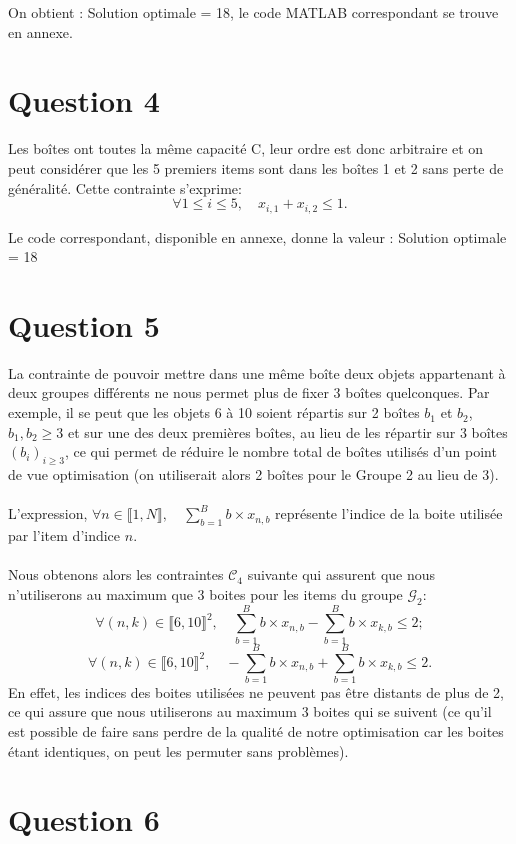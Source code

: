 On obtient : Solution optimale  = 18, le code MATLAB correspondant se trouve en annexe.
\section{Question 4}
Les boîtes ont toutes la même capacité C, leur ordre est donc arbitraire et on peut considérer que les 5 premiers items sont dans les boîtes 1 et 2 sans perte de généralité.
Cette contrainte s'exprime: 
$$ \boxed{\forall 1\leq i\leq 5, \quad x_{i,1} + x_{i,2} \leq 1.} $$

Le code correspondant, disponible en annexe, donne la valeur : Solution optimale  = 18

\section{Question 5}
La contrainte de pouvoir mettre dans une même boîte deux objets appartenant à deux groupes différents ne nous permet plus de fixer 3 boîtes quelconques. Par exemple, il se peut que les objets 6 à 10 soient répartis sur 2 boîtes $b_1$ et $b_2$, $b_1,b_2\geq3$ et sur une des deux premières boîtes, au lieu de les répartir sur 3 boîtes $(b_i)_{i\geq3}$, ce qui permet de réduire le nombre total de boîtes utilisés  d'un point de vue optimisation (on utiliserait alors 2 boîtes pour le Groupe 2 au lieu de 3).\\ \\
L'expression, \(\forall n \in \llbracket 1, N \rrbracket, \quad \displaystyle \sum_{b=1}^B b\times x_{n,b}\) représente l'indice de la boite utilisée par l'item d'indice $n$.\\ \\
Nous obtenons alors les contraintes \(\mathcal{C}_4\) suivante qui assurent que nous n'utiliserons au maximum que 3 boites pour les items du groupe \(\mathcal{G}_2\): 
$$ \boxed{\forall (n, k) \in \llbracket 6, 10 \rrbracket^2, \quad \sum_{b=1}^B b\times x_{n,b} - \sum_{b=1}^B b\times x_{k,b} \leq 2;} $$
$$ \boxed{\forall (n, k) \in \llbracket 6, 10 \rrbracket^2, \quad -\sum_{b=1}^B b\times x_{n,b} +\sum_{b=1}^B b\times x_{k,b} \leq 2.} $$
En effet, les indices des boites utilisées ne peuvent pas être distants de plus de 2, ce qui assure que nous utiliserons au maximum 3 boites qui se suivent (ce qu'il est possible de faire sans perdre de la qualité de notre optimisation car les boites étant identiques, on peut les permuter sans problèmes).

\section{Question 6}

